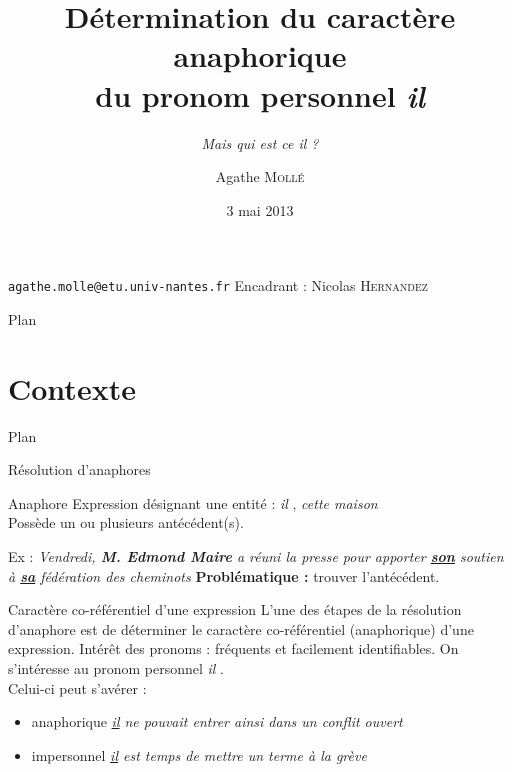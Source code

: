 \documentclass{beamer}
\title[Mais qui est ce \og \textit{il} \fg{} ?]{Détermination du caractère anaphorique\\ du pronom personnel \og{}\textit{il}\fg{}}
\subtitle{\textit{Mais qui est ce \og il \fg{} ?}}
\author{Agathe \textsc{Mollé}}
\institute{Université de Nantes}
\date{3 mai 2013}
\begin{document}
\begin{frame}
  \titlepage
  \begin{center}
  \verb!agathe.molle@etu.univ-nantes.fr!
  \vskip 1cm
  Encadrant : Nicolas \textsc{Hernandez}
  \end{center}
\end{frame}

\begin{frame}{Plan}
  \tableofcontents
\end{frame}


\section{Contexte}

\begin{frame}{Plan}
  \tableofcontents[currentsection]
\end{frame}

\begin{frame}{Résolution d'anaphores}
\begin{block}{Anaphore}
Expression désignant une entité : \og \textit{il} \fg{}, \og \textit{cette maison} \fg{} \\
Possède un ou plusieurs antécédent(s).\\
\end{block}
Ex : \og \textit{Vendredi, \textbf{M. Edmond Maire} a réuni la presse pour apporter \underline{\textbf{son}} soutien à \underline{\textbf{sa}} fédération des cheminots} \fg{}
\vskip 1cm
\textbf{Problématique :} trouver l'antécédent.\\
\end{frame}

\begin{frame}{Caractère co-référentiel d'une expression}
L'une des étapes de la résolution d'anaphore est de déterminer le caractère co-référentiel (anaphorique) d'une expression.
\vskip 0.5cm
Intérêt des pronoms : fréquents et facilement identifiables.
\vskip 0.5cm
On s'intéresse au pronom personnel \og \textit{il} \fg{}.\\
Celui-ci peut s'avérer :
\begin{itemize}
  \item anaphorique \og{}\textit{\underline{il} ne pouvait entrer ainsi dans un conflit ouvert}\fg{}
  \item impersonnel \og{}\textit{\underline{il} est temps de mettre un terme à la grève}\fg{}
\end{itemize}
\end{frame}
\end{document}
